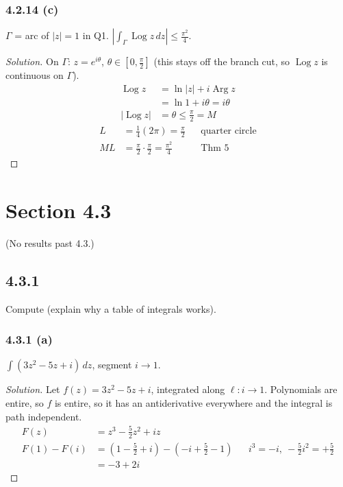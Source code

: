 \documentclass{article}
\newenvironment{solution}{
\begin{proof}[Solution]}{
\end{proof}}
\begin{document}
\subsubsection*{4.2.14 (c)}
$\Gamma$ = arc of $|z|=1$ in Q1. $\left|\int_\Gamma \operatorname{Log} z\,dz\right| \le \frac{\pi^2}{4}$.
\begin{solution}
  On $\Gamma$: $z = e^{i\theta}$, $\theta \in \left[0, \frac{\pi}{2}\right]$
  (this stays off the branch cut, so $\operatorname{Log} z$ is continuous on $\Gamma$).
  \begin{align*}
    \operatorname{Log} z   & = \ln|z| + i\operatorname{Arg} z \\
                           & = \ln 1 + i\theta = i\theta \\
    |\operatorname{Log} z| & = \theta \le \frac{\pi}{2} = M
  \end{align*}
  \begin{align*}
    L  & = \frac{1}{4}(2\pi) = \frac{\pi}{2} && \text{quarter circle} \\
    ML & = \frac{\pi}{2}\cdot\frac{\pi}{2} = \frac{\pi^2}{4} && \text{Thm 5}
  \end{align*}
\end{solution}

\section*{Section 4.3}
(No results past 4.3.)

\subsection*{4.3.1}
Compute (explain why a table of integrals works).

\subsubsection*{4.3.1 (a)}
$\int (3z^2 - 5z + i)\,dz$, segment $i \to 1$.
\begin{solution}
  Let $f(z) = 3z^2 - 5z + i$, integrated along $\ell: i \to 1$.
  Polynomials are entire, so $f$ is entire, so it has an antiderivative everywhere and the
  integral is path independent.
  \begin{align*}
    F(z)        & = z^3 - \frac{5}{2}z^2 + iz \\
    F(1) - F(i) & = \left(1 - \frac{5}{2} + i\right) - \left(-i + \frac{5}{2} - 1\right)
                  && i^3 = -i,\ -\tfrac{5}{2}i^2 = +\tfrac{5}{2} \\
                & = -3 + 2i
  \end{align*}
\end{solution}
\end{document}
